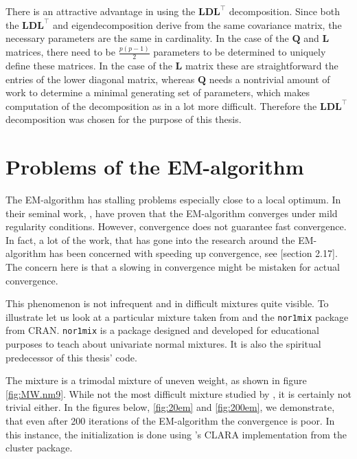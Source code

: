 There is an attractive advantage in using the $\pmb{LDL}^\top$ decomposition.
Since both the $\pmb{LDL}^\top$ and eigendecomposition derive from the same 
covariance matrix, the necessary parameters are the same in cardinality.
In the case of the $\pmb{Q}$ and $\pmb{L}$ matrices, there need to be $\frac{p(p-1)}{2}$
parameters to be determined to uniquely define these matrices.
In the case of the $\pmb{L}$ matrix these are straightforward the entries of 
the lower diagonal matrix, whereas $\pmb{Q}$ needs a nontrivial amount of work
to determine a minimal generating set of parameters, which makes computation
of the decomposition as in \cite{Cel95} a lot more difficult.
Therefore the $\pmb{LDL}^\top$ decomposition was chosen for the purpose of this
thesis.


\section{Problems of the EM-algorithm}
\label{sec:emproblems}


The EM-algorithm has stalling problems especially close to a local optimum.
In their seminal work, \cite{Dem77}, have proven that the EM-algorithm 
converges under mild regularity conditions. 
However, convergence does not guarantee fast convergence. In fact, a lot of 
the work, that has gone into the research around the EM-algorithm has been 
concerned with speeding up convergence, see \cite{McL00}[section 2.17].
The concern here is that a slowing in convergence might be mistaken for actual
convergence.

This phenomenon is not infrequent and in difficult mixtures quite visible.
To illustrate let us look at a particular mixture taken from \cite{Mar92} and
the {\tt nor1mix} package from CRAN.
{\tt nor1mix} is a package designed and developed for educational purposes to 
teach about univariate normal mixtures. It is also the spiritual predecessor 
of this thesis' \Rp code.

The mixture is a trimodal mixture of uneven weight, as shown in figure
\ref{fig:MW.nm9}.
While not the most difficult mixture studied by \cite{Mar92}, it is certainly
not trivial either.
In the figures below, \ref{fig:20em} and \ref{fig:200em}, we demonstrate, that
even after 200 iterations of the EM-algorithm the convergence is poor.
In this instance, the initialization is done using \Rp's CLARA implementation
from the cluster package. %



